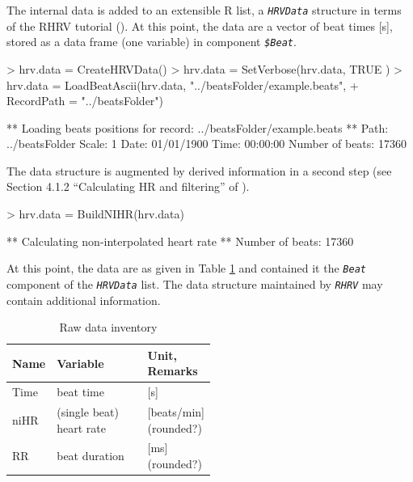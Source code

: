 \documentclass[a4paper, english, utf8]{amsart}
\makeatletter
\newcommand\code[1]{\textsl{\texttt{#1}}}
\newcommand\codex[1]{\textsl{\texttt{#1}}\index{#1@\texttt{#1}|textit}}
\makeatother
\begin{document}
The internal data is added to an extensible R list, a \codex{HRVData} structure in
terms of the RHRV tutorial (\cite{Garcia:2014aaTutorial}). At this point, the data
are a vector of  beat times [s], stored as a data frame (one variable) in component \code{\$Beat}.

\begin{Schunk}
\begin{Sinput}
> hrv.data  = CreateHRVData()
> hrv.data = SetVerbose(hrv.data, TRUE )
> hrv.data = LoadBeatAscii(hrv.data, "../beatsFolder/example.beats",
+        RecordPath = "../beatsFolder")
\end{Sinput}
\begin{Soutput}
** Loading beats positions for record: ../beatsFolder/example.beats **
   Path: ../beatsFolder 
   Scale: 1 
   Date: 01/01/1900
   Time: 00:00:00
   Number of beats: 17360 
\end{Soutput}
\end{Schunk}

The data structure is augmented by derived information in a second step (see Section 4.1.2 ``Calculating HR and filtering'' of \cite{Garcia:2014aaTutorial}).
\begin{Schunk}
\begin{Sinput}
> hrv.data = BuildNIHR(hrv.data)
\end{Sinput}
\begin{Soutput}
** Calculating non-interpolated heart rate **
   Number of beats: 17360 
\end{Soutput}
\end{Schunk}

At this point, the data are as given in Table \ref{tab:inventory} and contained it the \code{Beat} component of the \code{HRVData} list. The data structure maintained by \code{RHRV} may contain additional information.

\begin{table}
\begin{center}
\begin{tabular}{|l|p{0.5\linewidth}|l|}
\hline
\rowcolor[gray]{0.8}%
Name&Variable&Unit, Remarks\\
\hline
Time&beat time&[s]\\
niHR&(single beat) heart rate&[beats/min] (rounded?)\\
RR&beat duration&[ms]  (rounded?)\\
\hline
\end{tabular}
\end{center}
\caption{Raw data inventory}\label{tab:inventory}
\end{table}
\end{document}
